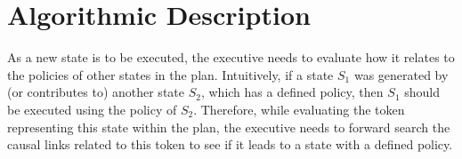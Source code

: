 %
%
%
%
%


\section{Algorithmic Description}
\label{sec:algo}

As a new state is to be executed, the executive needs
to evaluate how it relates to the policies of other states in the plan. Intuitively, if
a state $S_1$ was generated by (or contributes to) another state $S_2$, which has a defined policy, then
$S_1$ should be executed using the policy of $S_2$. Therefore, while
evaluating the token representing this state within the plan, the
executive needs to forward search the causal links related to this
token to see if it leads to a state with a defined policy. 



